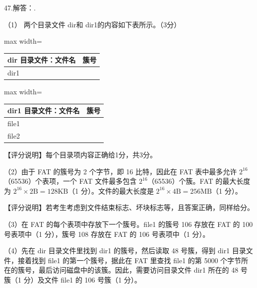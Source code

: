 \documentclass[UTF8,11pt]{ctexart}
\begin{document}
47.解答：.


（1） 两个目录文件 dir和 dir1的内容如下表所示。（3分）


\begin{center}\begin{adjustbox}{max width=\linewidth}\begin{tabular}{|>{\raggedright\arraybackslash}p{\dimexpr(\linewidth-4\tabcolsep-3\arrayrulewidth)/2\relax}|>{\raggedright\arraybackslash}p{\dimexpr(\linewidth-4\tabcolsep-3\arrayrulewidth)/2\relax}|}\hline
dir 目录文件：文件名 & 簇号\\\hline
dir1 & 48\\\hline\end{tabular}\end{adjustbox}\end{center}

\begin{center}\begin{adjustbox}{max width=\linewidth}\begin{tabular}{|>{\raggedright\arraybackslash}p{\dimexpr(\linewidth-4\tabcolsep-3\arrayrulewidth)/2\relax}|>{\raggedright\arraybackslash}p{\dimexpr(\linewidth-4\tabcolsep-3\arrayrulewidth)/2\relax}|}\hline
dir1 目录文件：文件名 & 簇号\\\hline
file1 & 100\\\hline
file2 & 200\\\hline\end{tabular}\end{adjustbox}\end{center}

【评分说明】每个目录项内容正确给1分，共3分。


（2）由于 FAT 的簇号为 2 个字节，即 16 比特，因此在 FAT 表中最多允许 \(\displaystyle 2^{16}\)（65536）个表项，一个 FAT 文件最多包含 \(\displaystyle 2^{16}\)（65536）个簇。FAT 的最大长度为 \(\displaystyle 2^{16}\times2\mathrm{B}=128\mathrm{KB}\)（1 分）。文件的最大长度是 \(\displaystyle 2^{16}\times4\mathrm{B}=256\mathrm{MB}\)（1 分）。


【评分说明】若考生考虑到文件结束标志、坏块标志等，且答案正确，同样给分。


（3）在 FAT 的每个表项中存放下一个簇号。file1 的簇号 106 存放在 FAT 的 100 号表项中（1 分），簇号 108 存放在 FAT 的 106 号表项中（1 分）。


（4）先在 dir 目录文件里找到 dir1 的簇号，然后读取 48 号簇，得到 dir1 目录文件，接着找到 file1 的第一个簇号，据此在 FAT 里查找 file1 的第 5000 个字节所在的簇号，最后访问磁盘中的该簇。因此，需要访问目录文件 dir1 所在的 48 号簇（1 分）及文件 file1 的 106 号簇（1 分）。
\end{document}
